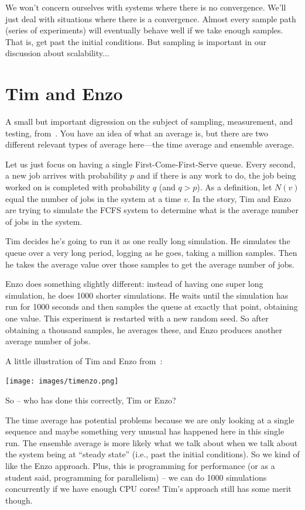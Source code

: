 \documentclass[a4paper]{report}
\begin{document}
We won't concern ourselves with systems where there is no convergence. We'll just deal with situations where there is a convergence. Almost every sample path (series of experiments) will eventually behave well if we take enough samples. That is, get past the initial conditions. But sampling is important in our discussion about scalability...

\section*{Tim and Enzo}
A small but important digression on the subject of sampling, measurement, and testing, from~\cite{pmd}. You have an idea of what an average is, but there are two different relevant types of average here---the time average and ensemble average. 

Let us just focus on having a single First-Come-First-Serve queue. Every second, a new job arrives with probability $p$ and if there is any work to do, the job being worked on is completed with probability $q$ (and $q > p$). As a definition, let $N(v)$ equal the number of jobs in the system at a time $v$. In the story, Tim and Enzo are trying to simulate the FCFS system to determine what is the average number of jobs in the system. 

Tim decides he's going to run it as one really long simulation. He simulates the queue over a very long period, logging as he goes, taking a million samples. Then he takes the average value over those samples to get the average number of jobs.

Enzo does something slightly different: instead of having one super long simulation, he does 1000 shorter simulations. He waits until the simulation has run for 1000 seconds and then samples the queue at exactly that point, obtaining one value. This experiment is restarted with a new random seed. So after obtaining a thousand samples, he averages these, and Enzo produces another average number of jobs.

A little illustration of Tim and Enzo from~\cite{pmd}:

\begin{center}
	\texttt{[image: images/timenzo.png]}
\end{center}

So -- who has done this correctly, Tim or Enzo?

The time average has potential problems because we are only looking at a single sequence and maybe something very unusual has happened here in this single run. The ensemble average is more likely what we talk about when we talk about the system being at ``steady state'' (i.e., past the initial conditions). So we kind of like the Enzo approach. Plus, this is programming for performance (or as a student said, programming for parallelism) -- we can do 1000 simulations concurrently if we have enough CPU cores! Tim's approach still has some merit though.
\end{document}
